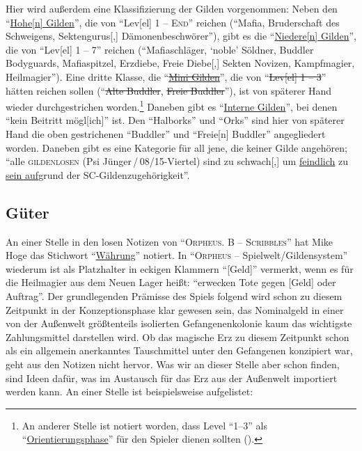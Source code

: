 \documentclass[a5paper,pagesize,numbers=noenddot]{scrbook}
\begin{document}
Hier wird außerdem eine Klassifizierung der Gilden vorgenommen:
Neben den \enquote{\uline{Hohe[n] Gilden}}, die von \enquote{Lev[el] 1 -- \textsc{End}} reichen (\enquote{Mafia, Bruderschaft des Schweigens, Sektengurus[,] Dämonenbeschwörer}), gibt es die \enquote{\uline{Niedere[n] Gilden}}, die von \enquote{Lev[el] 1 -- 7} reichen (\enquote{Mafiaschläger, \enquote{noble} Söldner, Buddler Bodyguards, Mafiaspitzel, Erzdiebe, Freie Diebe[,] Sekten Novizen, Kampfmagier, Heilmagier}).
Eine dritte Klasse, die \enquote{\uline{\sout{Mini Gilden}}}, die von \enquote{\sout{Lev[el] 1 -- 3}} hätten reichen sollen (\enquote{\sout{Alte Buddler}, \sout{Freie Buddler}}), ist von späterer Hand wieder durchgestrichen worden.\footnote{An anderer Stelle ist notiert worden, dass Level \enquote{1--3} als \enquote{\uline{Orientierungsphase}} für den Spieler dienen sollten (\autocite[S.~10]{orpheus_b_scribbles}).}
Daneben gibt es \enquote{\uline{Interne Gilden}}, bei denen \enquote{kein Beitritt mögl[ich]} ist.
Den \enquote{Halborks} und \enquote{Orks} sind hier von späterer Hand die oben gestrichenen \enquote{Buddler} und \enquote{Freie[n] Buddler} angegliedert worden.
Daneben gibt es eine Kategorie für all jene, die keiner Gilde angehören; \enquote{alle \textsc{gildenlosen} (Psi Jünger\,/\,08/15-Viertel) sind zu schwach[,] um \uline{feindlich} zu \uline{sein auf}grund der SC-Gildenzugehörigkeit}.


\subsection{Güter}\label{sec:orpheus_welt_gueter}
An einer Stelle in den losen Notizen von \enquote{\textsc{Orpheus. B -- Scribbles}} hat Mike Hoge das Stichwort \enquote{\uline{Währung}} notiert.\autocite[S.~6]{orpheus_b_scribbles}
In \enquote{\textsc{Orpheus} -- Spielwelt/Gildensys\-tem} wiederum ist als Platzhalter in eckigen Klammern \enquote{[Geld]} vermerkt, wenn es für die Heilmagier aus dem Neuen Lager heißt:
\enquote{erwecken Tote gegen [Geld] oder Auftrag}.\autocite[S.~7]{orpheus_gildensystem}
Der grundlegenden Prämisse des Spiels folgend wird schon zu diesem Zeitpunkt in der Konzeptionsphase klar gewesen sein, das Nominalgeld in einer von der Außenwelt größtenteils isolierten Gefangenenkolonie kaum das wichtigste Zahlungsmittel darstellen wird.
Ob das magische Erz zu diesem Zeitpunkt schon als ein allgemein anerkanntes Tauschmittel unter den Gefangenen konzipiert war, geht aus den Notizen nicht hervor. %
Was wir an dieser Stelle aber schon finden, sind Ideen dafür, was im Austausch für das Erz aus der Außenwelt importiert werden kann.
An einer Stelle ist beispielsweise aufgelistet:
\end{document}
